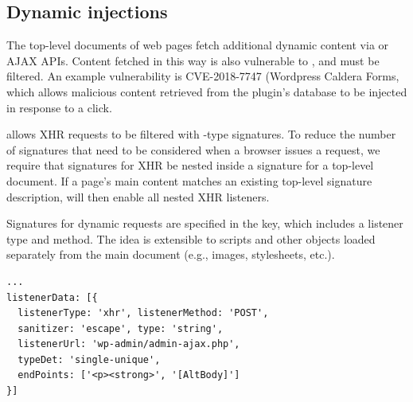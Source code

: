 \subsection{Dynamic injections} \label{dynamic_injections}

The top-level documents of web pages fetch additional dynamic content
via  or AJAX APIs. Content fetched in
this way is also vulnerable to \xss, and must be filtered. An example
vulnerability is CVE-2018-7747 (Wordpress Caldera Forms, which allows malicious
content retrieved from the plugin's database to be injected in response to a click.

\sys allows XHR requests to be filtered with -type
signatures. To reduce the number of signatures that need to be
considered when a browser issues a request, we require that signatures
for XHR be nested inside a signature for a top-level document. If a
page's main content matches an existing top-level signature description,
\sys will then enable all nested XHR listeners.

Signatures for dynamic requests are specified in the 
key, which includes a listener type and method. The idea is extensible
to scripts and other objects loaded separately from the main document
(e.g., images, stylesheets, etc.).

\begin{lstlisting}[breaklines=true,caption={
      An example dynamic request signature. This patches CVE-2018-7747.
    },label={lst:dynamic_signature}]
...
listenerData: [{
  listenerType: 'xhr', listenerMethod: 'POST',
  sanitizer: 'escape', type: 'string',
  listenerUrl: 'wp-admin/admin-ajax.php',
  typeDet: 'single-unique',
  endPoints: ['<p><strong>', '[AltBody]']
}]
\end{lstlisting}


